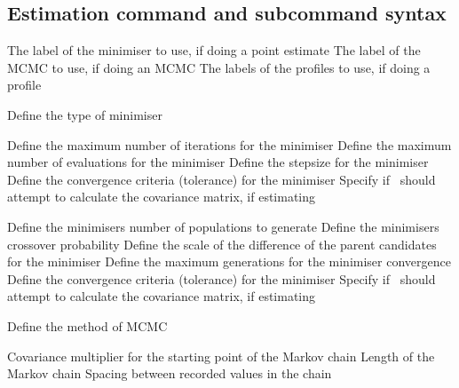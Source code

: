 \subsection{Estimation command and subcommand syntax}\par
{}\par\par
{} {The label of the minimiser to use, if doing a point estimate}
 {The label of the MCMC to use, if doing an MCMC}
 {The labels of the profiles to use, if doing a profile}
\par{}\par\par
{} {Define the type of minimiser}
\par\textbf{}\par
{} {Define the maximum number of iterations for the minimiser}
 {Define the maximum number of evaluations for the minimiser}
 {Define the stepsize for the minimiser}
 {Define the convergence criteria (tolerance) for the minimiser}
 {Specify if \SPM\ should attempt to calculate the covariance matrix, if estimating}
\par\textbf{}\par
{} {Define the minimisers number of populations to generate}
 {Define the minimisers crossover probability }
 {Define the scale of the difference of the parent candidates for the minimiser}
 {Define the maximum generations for the minimiser convergence}
 {Define the convergence criteria (tolerance) for the minimiser}
 {Specify if \SPM\ should attempt to calculate the covariance matrix, if estimating}
\par{}\par\par
{} {Define the method of MCMC}
\par\textbf{}\par
{} {Covariance multiplier for the starting point of the Markov chain}
 {Length of the Markov chain}
 {Spacing between recorded values in the chain}
